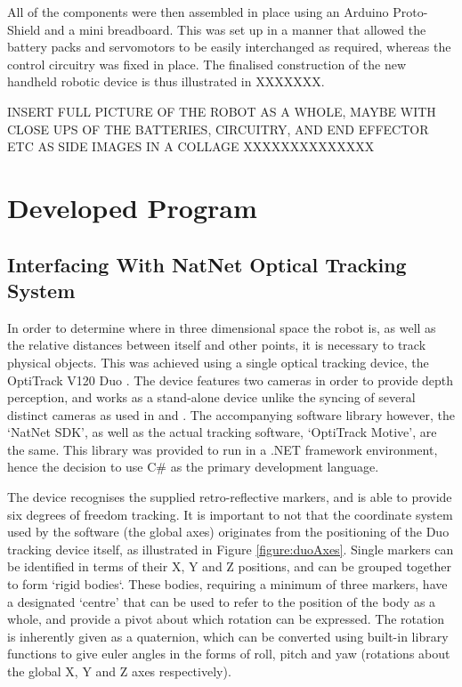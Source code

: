 \documentclass[11pt]{article}
\begin{document}
All of the components were then assembled in place using an Arduino Proto-Shield and a mini breadboard. This was set up in a manner that allowed the battery packs and servomotors to be easily interchanged as required, whereas the control circuitry was fixed in place. The finalised construction of the new handheld robotic device is thus illustrated in XXXXXXX.

INSERT FULL PICTURE OF THE ROBOT AS A WHOLE, MAYBE WITH CLOSE UPS OF THE BATTERIES, CIRCUITRY, AND END EFFECTOR ETC AS SIDE IMAGES IN A COLLAGE XXXXXXXXXXXXXX

\pagebreak
\section{Developed Program}

\subsection{Interfacing With NatNet Optical Tracking System}
\label{section:natnet}
In order to determine where in three dimensional space the robot is, as well as the relative distances between itself and other points, it is necessary to track physical objects. This was achieved using a single optical tracking device, the OptiTrack V120 Duo \cite{OptiTrackSite}. The device features two cameras in order to provide depth perception, and works as a stand-alone device unlike the syncing of several distinct cameras as used in \cite{GreggSmithDesign} and \cite{GreggSmithFeedback}. The accompanying software library however, the `NatNet SDK', as well as the actual tracking software, `OptiTrack Motive', are the same. This library was provided to run in a .NET framework environment, hence the decision to use C\# as the primary development language.

The device recognises the supplied retro-reflective markers, and is able to provide six degrees of freedom tracking. It is important to not that the coordinate system used by the software (the global axes) originates from the positioning of the Duo tracking device itself, as illustrated in Figure \ref{figure:duoAxes}. Single markers can be identified in terms of their X, Y and Z positions, and can be grouped together to form `rigid bodies`. These bodies, requiring a minimum of three markers, have a designated `centre' that can be used to refer to the position of the body as a whole, and provide a pivot about which rotation can be expressed. The rotation is inherently given as a quaternion, which can be converted using built-in library functions to give euler angles in the forms of roll, pitch and yaw (rotations about the global X, Y and Z axes respectively).
\end{document}
